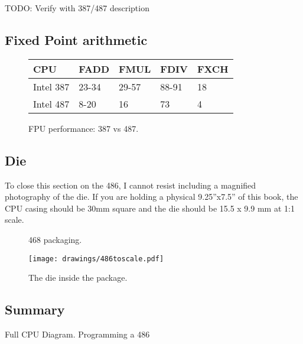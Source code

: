 TODO: Verify with 387/487 description

\subsection{Fixed Point arithmetic}

\par
\begin{figure}[H]
\centering
\begin{tabularx}{\textwidth}{ X  X X  X  X}
  \toprule
  \textbf{CPU} & \textbf{FADD} & \textbf{FMUL} & \textbf{FDIV} &\textbf{FXCH} \\ \bottomrule
Intel 387 & 23-34 & 29-57   & 88-91 & 18 \\
Intel 487 & 8-20  & 16   & 73 & 4 \\ \bottomrule
\end{tabularx}
\caption{FPU performance: 387 vs 487.}
\label{perf_summary}
\end{figure}


\subsection{Die}
To close this section on the 486, I cannot resist including a magnified photography of the die. If you are holding a physical 9.25''x7.5'' of this book, the CPU casing should be 30mm square and the die should be 15.5 x 9.9 mm at 1:1 scale.\\
\par
\bigskip

  \begin{figure}[!htb]

\begin{minipage}{0.48\textwidth}
\centering
{}
\caption{468 packaging.}
\end{minipage}
\hfill
\begin{minipage}{0.48\textwidth}
\centering
\texttt{[image: drawings/486toscale.pdf]}
\caption{The die inside the package.}
\end{minipage}
\end{figure}

\par



\begin{figure}[H]
\centering
{}
\end{figure}
\par
\begin{figure}[H]
\centering
{}
\end{figure}

\subsection{Summary}
Full CPU Diagram.
Programming a 486